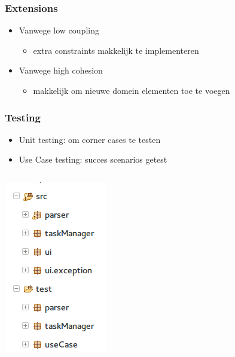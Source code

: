 \documentclass{beamer}
\begin{document}
\begin{frame}
\frametitle{Extensions}
\begin{itemize}
\item Vanwege low coupling
\begin{itemize}
\item extra constraints makkelijk te implementeren
\end{itemize}
\item Vanwege high cohesion
\begin{itemize}
\item makkelijk om nieuwe domein elementen toe te voegen
\end{itemize}
\end{itemize}
\end{frame}

%

\begin{frame}
\frametitle {Testing}
\begin{itemize}
    \item Unit testing: om corner cases te testen
    \item Use Case testing: succes scenarios getest
\end{itemize}
\begin{columns}
    \begin{column}{.4\paperwidth}
        \includegraphics[width=0.25\paperwidth]{figures/Package_overview_eclipse.png}
    \end{column}
    \begin{column}{.5\paperwidth}
   
    \end{column}
\end{columns}
\end{frame}
\end{document}
